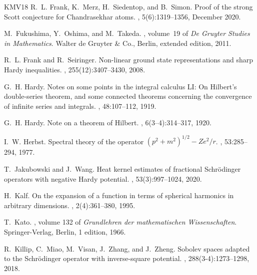 \documentclass[12pt,reqno]{amsart}
\theoremstyle{definition}
\theoremstyle{remark}
\numberwithin{equation}{section}
\newcommand{\1}{\mathbbm{1}}
\begin{document}
\begin{thebibliography}{KMV{\etalchar{+}}18}
R.~L. {Frank}, K.~{Merz}, H.~{Siedentop}, and B.~{Simon}.
\newblock Proof of the strong {S}cott conjecture for {C}handrasekhar atoms.
, 5(6):1319--1356, December 2020.

M.~Fukushima, Y.~Oshima, and M.~Takeda.
, volume~19 of
  {\em De Gruyter Studies in Mathematics}.
\newblock Walter de Gruyter \& Co., Berlin, extended edition, 2011.

R.~L. Frank and R.~Seiringer.
\newblock Non-linear ground state representations and sharp {H}ardy
  inequalities.
, 255(12):3407--3430, 2008.

G.~H. Hardy.
\newblock Notes on some points in the integral calculus {LI}: On {H}ilbert's
  double-series theorem, and some connected theorems concerning the convergence
  of infinite series and integrals.
, 48:107--112, 1919.

G.~H. Hardy.
\newblock Note on a theorem of {H}ilbert.
, 6(3--4):314--317, 1920.

I.~W. Herbst.
\newblock Spectral theory of the operator {$(p^2+m^2)^{1/2} - Ze^2/r$}.
, 53:285--294, 1977.

T.~Jakubowski and J.~Wang.
\newblock Heat kernel estimates of fractional {S}chr\"{o}dinger operators with
  negative {H}ardy potential.
, 53(3):997--1024, 2020.

H.~Kalf.
\newblock On the expansion of a function in terms of spherical harmonics in
  arbitrary dimensions.
, 2(4):361--380, 1995.

T.~Kato.
, volume 132 of {\em
  Grundlehren der mathematischen {W}issenschaften}.
\newblock Springer-Verlag, Berlin, 1 edition, 1966.

R.~Killip, C.~Miao, M.~Visan, J.~Zhang, and J.~Zheng.
\newblock Sobolev spaces adapted to the {S}chr\"odinger operator with
  inverse-square potential.
, 288(3-4):1273--1298, 2018.


\end{thebibliography}
\end{document}
